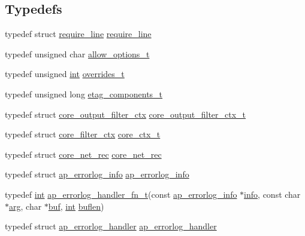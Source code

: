 \subsection*{Typedefs}
\begin{DoxyCompactItemize}
\item 
typedef struct \hyperlink{structrequire__line}{require\+\_\+line} \hyperlink{group__APACHE__CORE__HTTPD_gaa22be20e510863cf000b5466f16ce6d4}{require\+\_\+line}
\item 
typedef unsigned char \hyperlink{group__APACHE__CORE__HTTPD_ga690d446d4d1bb68e9b9ad82e1de6faa2}{allow\+\_\+options\+\_\+t}
\item 
typedef unsigned \hyperlink{pcre_8txt_a42dfa4ff673c82d8efe7144098fbc198}{int} \hyperlink{group__APACHE__CORE__HTTPD_ga4c9d0f694a232ecee18b53bfe18a8ce6}{overrides\+\_\+t}
\item 
typedef unsigned long \hyperlink{group__APACHE__CORE__HTTPD_gaf3e69b939656940e28afaf69f5b186f9}{etag\+\_\+components\+\_\+t}
\item 
typedef struct \hyperlink{structcore__output__filter__ctx}{core\+\_\+output\+\_\+filter\+\_\+ctx} \hyperlink{group__APACHE__CORE__HTTPD_gadbd89ce394d25002077122416b3c889c}{core\+\_\+output\+\_\+filter\+\_\+ctx\+\_\+t}
\item 
typedef struct \hyperlink{structcore__filter__ctx}{core\+\_\+filter\+\_\+ctx} \hyperlink{group__APACHE__CORE__HTTPD_ga9d058483cac7066cb341b504b16b6ada}{core\+\_\+ctx\+\_\+t}
\item 
typedef struct \hyperlink{structcore__net__rec}{core\+\_\+net\+\_\+rec} \hyperlink{group__APACHE__CORE__HTTPD_ga1f169914bc5f5088bd57760a13b54f7b}{core\+\_\+net\+\_\+rec}
\item 
typedef struct \hyperlink{structap__errorlog__info}{ap\+\_\+errorlog\+\_\+info} \hyperlink{group__APACHE__CORE__HTTPD_ga76ce2aab695e109bbf222898e7240986}{ap\+\_\+errorlog\+\_\+info}
\item 
typedef \hyperlink{pcre_8txt_a42dfa4ff673c82d8efe7144098fbc198}{int} \hyperlink{group__APACHE__CORE__HTTPD_gae2b87862d08783b06d2f1b6dfb161bca}{ap\+\_\+errorlog\+\_\+handler\+\_\+fn\+\_\+t}(const \hyperlink{structap__errorlog__info}{ap\+\_\+errorlog\+\_\+info} $\ast$\hyperlink{group__MOD__DAV_ga533561439682bae03f90d9e96eb1d30b}{info}, const char $\ast$\hyperlink{group__APACHE__CORE__MUTEX_gaf6517210150d97cd5cb8a17e3768770d}{arg}, char $\ast$\hyperlink{group__APR__Util__Bucket__Brigades_gae92da6cbed6002407731bd51f7c6b984}{buf}, \hyperlink{pcre_8txt_a42dfa4ff673c82d8efe7144098fbc198}{int} \hyperlink{group__apr__network__io_ga8440bfb8a3995b0c0119ea0a525ea341}{buflen})
\item 
typedef struct \hyperlink{structap__errorlog__handler}{ap\+\_\+errorlog\+\_\+handler} \hyperlink{group__APACHE__CORE__HTTPD_ga484307f4ac138544ebec225b0f4f910d}{ap\+\_\+errorlog\+\_\+handler}
\end{DoxyCompactItemize}
